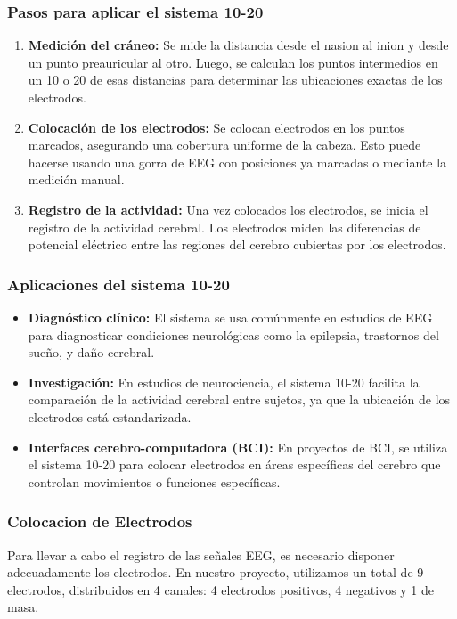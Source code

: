 \documentclass{article}
\begin{document}
\subsubsection{Pasos para aplicar el sistema 10-20}

\begin{enumerate}

    \item \textbf{Medición del cráneo:} Se mide la distancia desde el nasion al inion y desde un punto preauricular al otro. Luego, se calculan los puntos intermedios en un 10 o 20 de esas distancias para determinar las ubicaciones exactas de los electrodos.
    
    \item \textbf{Colocación de los electrodos:} Se colocan electrodos en los puntos marcados, asegurando una cobertura uniforme de la cabeza. Esto puede hacerse usando una gorra de EEG con posiciones ya marcadas o mediante la medición manual.
    
    \item \textbf{Registro de la actividad:} Una vez colocados los electrodos, se inicia el registro de la actividad cerebral. Los electrodos miden las diferencias de potencial eléctrico entre las regiones del cerebro cubiertas por los electrodos.
\end{enumerate}

\subsubsection{Aplicaciones del sistema 10-20}
\begin{itemize}
    \item \textbf{Diagnóstico clínico:} El sistema se usa comúnmente en estudios de EEG para diagnosticar condiciones neurológicas como la epilepsia, trastornos del sueño, y daño cerebral.
    \item \textbf{Investigación:} En estudios de neurociencia, el sistema 10-20 facilita la comparación de la actividad cerebral entre sujetos, ya que la ubicación de los electrodos está estandarizada.
    \item \textbf{Interfaces cerebro-computadora (BCI):} En proyectos de BCI, se utiliza el sistema 10-20 para colocar electrodos en áreas específicas del cerebro que controlan movimientos o funciones específicas.
\end{itemize}

\subsubsection{Colocacion de Electrodos}
Para llevar a cabo el registro de las señales EEG, es necesario disponer adecuadamente los electrodos. En nuestro proyecto, utilizamos un total de 9 electrodos, distribuidos en 4 canales: 4 electrodos positivos, 4 negativos y 1 de masa.
\end{document}
